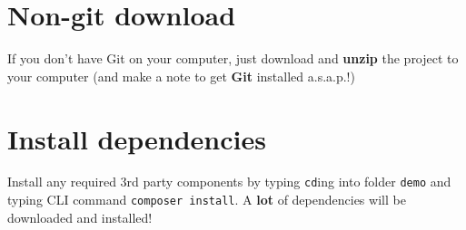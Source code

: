\documentclass[a4paperpaper,openright]{book}
\newenvironment{Shaded}{}{}
\newcommand{\ExtensionTok}[1]{#1}
\newcommand{\KeywordTok}[1]{\textcolor[rgb]{0.00,0.44,0.13}{\textbf{#1}}}
\newcommand{\NormalTok}[1]{#1}
\newcommand{\StringTok}[1]{\textcolor[rgb]{0.25,0.44,0.63}{#1}}
\begin{document}
\begin{Shaded}
\end{Shaded}

\hypertarget{non-git-download}{%
\section{Non-git download}\label{non-git-download}}

If you don't have Git on your computer, just download and \textbf{unzip}
the project to your computer (and make a note to get \textbf{Git}
installed a.s.a.p.!)

\hypertarget{install-dependencies}{%
\section{Install dependencies}\label{install-dependencies}}

Install any required 3rd party components by typing \texttt{cd}ing into
folder \texttt{demo} and typing CLI command \texttt{composer\ install}.
A \textbf{lot} of dependencies will be downloaded and installed!
\end{document}
